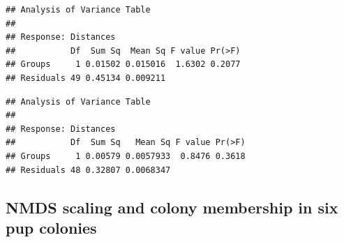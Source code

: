 \documentclass[]{article}
\newenvironment{Shaded}{\begin{snugshade}}{\end{snugshade}}
\newcommand{\KeywordTok}[1]{\textcolor[rgb]{0.13,0.29,0.53}{\textbf{#1}}}
\newcommand{\DataTypeTok}[1]{\textcolor[rgb]{0.13,0.29,0.53}{#1}}
\newcommand{\StringTok}[1]{\textcolor[rgb]{0.31,0.60,0.02}{#1}}
\newcommand{\OperatorTok}[1]{\textcolor[rgb]{0.81,0.36,0.00}{\textbf{#1}}}
\newcommand{\NormalTok}[1]{#1}
\begin{document}
\begin{verbatim}
## Analysis of Variance Table
## 
## Response: Distances
##           Df  Sum Sq  Mean Sq F value Pr(>F)
## Groups     1 0.01502 0.015016  1.6302 0.2077
## Residuals 49 0.45134 0.009211
\end{verbatim}

\begin{Shaded}
\end{Shaded}

\begin{verbatim}
## Analysis of Variance Table
## 
## Response: Distances
##           Df  Sum Sq   Mean Sq F value Pr(>F)
## Groups     1 0.00579 0.0057933  0.8476 0.3618
## Residuals 48 0.32807 0.0068347
\end{verbatim}

\subsection{NMDS scaling and colony membership in six pup
colonies}\label{nmds-scaling-and-colony-membership-in-six-pup-colonies}
\end{document}
